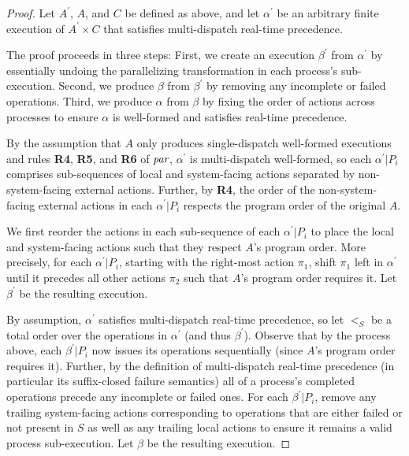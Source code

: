 \begin{proof}
  Let $A^\prime$, $A$, and $C$ be defined as above, and let $\alpha^\prime$ be an arbitrary finite execution of $A^\prime \times C$ that satisfies multi-dispatch real-time precedence.

  The proof proceeds in three steps: First, we create an execution $\beta^\prime$ from $\alpha^\prime$ by essentially undoing the parallelizing transformation in each process's sub-execution. Second, we produce $\beta$ from $\beta^\prime$ by removing any incomplete or failed operations. Third, we produce $\alpha$ from $\beta$ by fixing the order of actions across processes to ensure $\alpha$ is well-formed and satisfies real-time precedence.

  By the assumption that $A$ only produces single-dispatch well-formed executions and rules \textbf{R4}, \textbf{R5}, and \textbf{R6} of $\operatorname*{\textit{par}}$, $\alpha^\prime$ is multi-dispatch well-formed, so each $\alpha^\prime | P_i$ comprises sub-sequences of local and system-facing actions separated by non-system-facing external actions. Further, by \textbf{R4}, the order of the non-system-facing external actions in each $\alpha^\prime | P_i$ respects the program order of the original $A$.

  We first reorder the actions in each sub-sequence of each $\alpha^\prime | P_i$ to place the local and system-facing actions such that they respect $A$'s program order. More precisely, for each $\alpha^\prime | P_i$, starting with the right-most action $\pi_1$, shift $\pi_1$ left in $\alpha^\prime$ until it precedes all other actions $\pi_2$ such that $A$'s program order requires it. Let $\beta^\prime$ be the resulting execution.

  By assumption, $\alpha^\prime$ satisfies multi-dispatch real-time precedence, so let $<_S$ be a total order over the operations in $\alpha^\prime$ (and thus $\beta^\prime$). Observe that by the process above, each $\beta^\prime | P_i$ now issues its operations sequentially (since $A$'s program order requires it). Further, by the definition of multi-dispatch real-time precedence (in particular its suffix-closed failure semantics) all of a process's completed operations precede any incomplete or failed ones. For each $\beta^\prime | P_i$, remove any trailing system-facing actions corresponding to operations that are either failed or not present in $S$ as well as any trailing local actions to ensure it remains a valid process sub-execution. Let $\beta$ be the resulting execution.


\end{proof}
